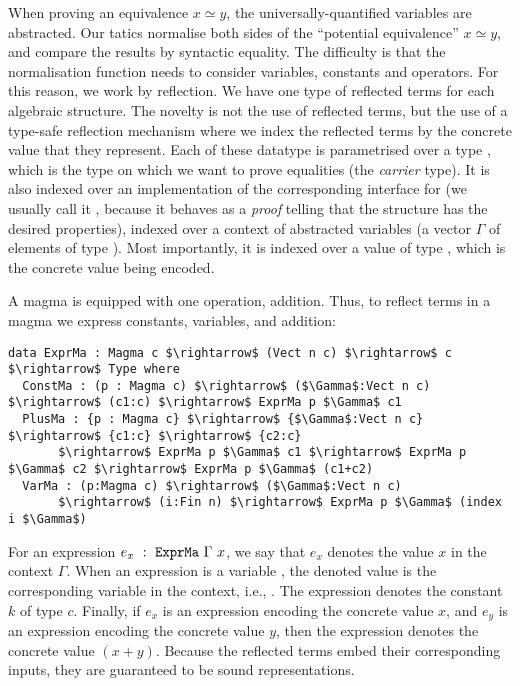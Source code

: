 When proving an equivalence $x \simeq y$, the universally-quantified
variables are abstracted. Our
tatics normalise both sides of the ``potential equivalence'' $x
\simeq y$, and compare the results by syntactic equality. The
difficulty is that the normalisation function needs to consider
variables, constants and operators. For this
reason, we work by reflection. We have one type of reflected
terms for each algebraic structure. The novelty is not the use of reflected
terms, but the use of a type-safe reflection
mechanism where we index the reflected terms by the concrete value that they
represent. Each of these datatype is parametrised over a type , which
is the type on which we want to prove equalities (the \emph{carrier}
type). It is also indexed over an implementation of the corresponding interface
for  (we usually call it , because it behaves as a \emph{proof}
telling that the structure  has the desired properties), indexed over a
context of abstracted variables (a vector $\Gamma$ of  elements of type
). Most importantly, it is indexed over a value of type ,
which is the concrete value being encoded.

A magma is equipped with one operation, addition. Thus, to reflect terms in a
magma we express constants, variables, and addition:

\begin{lstlisting}
data ExprMa : Magma c $\rightarrow$ (Vect n c) $\rightarrow$ c $\rightarrow$ Type where
  ConstMa : (p : Magma c) $\rightarrow$ ($\Gamma$:Vect n c) $\rightarrow$ (c1:c) $\rightarrow$ ExprMa p $\Gamma$ c1 
  PlusMa : {p : Magma c} $\rightarrow$ {$\Gamma$:Vect n c} $\rightarrow$ {c1:c} $\rightarrow$ {c2:c} 
       $\rightarrow$ ExprMa p $\Gamma$ c1 $\rightarrow$ ExprMa p $\Gamma$ c2 $\rightarrow$ ExprMa p $\Gamma$ (c1+c2) 
  VarMa : (p:Magma c) $\rightarrow$ ($\Gamma$:Vect n c)
       $\rightarrow$ (i:Fin n) $\rightarrow$ ExprMa p $\Gamma$ (index i $\Gamma$)
\end{lstlisting}


For an expression $e_x\ :\ \code{ExprMa}\ \Gamma\ x$, we say that $e_x$
denotes the value $x$ in the context $\Gamma$.  When an expression
is a variable , the denoted value is the
corresponding variable in the context, i.e., .  The
expression  denotes the constant $k$ of type
$c$. Finally, if $e_x$ is an expression encoding the concrete value $x$, and
$e_y$ is an expression encoding the concrete value $y$, then the expression
 denotes the concrete value $(x + y)$. Because the
reflected terms embed their corresponding inputs, they are guaranteed to be
sound representations.

